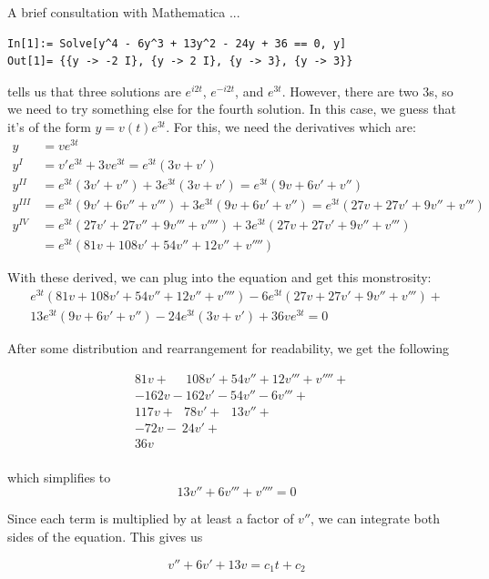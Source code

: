 \documentclass[11pt,answers]{exam}
\begin{document}
\begin{questions}
\begin{solution}
A brief consultation with Mathematica ...
\begin{verbatim}
In[1]:= Solve[y^4 - 6y^3 + 13y^2 - 24y + 36 == 0, y]
Out[1]= {{y -> -2 I}, {y -> 2 I}, {y -> 3}, {y -> 3}}
\end{verbatim}
tells us that three solutions are $e^{i2t}$, $e^{-i2t}$, and $e^{3t}$.  However, there are two $3$s, so we need to try something else for the fourth solution.  In this case, we guess that it's of the form $y = v(t)e^{3t}$.  For this, we need the derivatives which are:
\begin{align*}
y &= ve^{3t} \\
y^I &= v'e^{3t} + 3ve^{3t} = e^{3t}(3v + v') \\
y^{II} &= e^{3t}(3v' + v'') + 3e^{3t}(3v + v') = e^{3t}(9v + 6v' + v'') \\
y^{III} &= e^{3t}(9v' + 6v'' + v''') + 3e^{3t}(9v + 6v' + v'') = e^{3t}(27v + 27v' + 9v'' + v''') \\
y^{IV} &= e^{3t}(27v' + 27v'' + 9v''' + v'''') + 3e^{3t}(27v + 27v' + 9v'' + v''')\\
&= e^{3t}(81v + 108v' + 54v'' + 12v'' + v'''')
\end{align*}

With these derived, we can plug into the equation and get this monstrosity:
\begin{multline*}
e^{3t}(81v + 108v' + 54v'' + 12v'' + v'''') - 6e^{3t}(27v + 27v' + 9v'' + v''') + \\
13e^{3t}(9v + 6v' + v'') - 24e^{3t}(3v + v') + 36ve^{3t} = 0
\end{multline*}

After some distribution and rearrangement for readability, we get the following

\begin{align*}
&81v + \:\:\:\:\:\: 108v' + 54v'' + 12v''' + v''''  +  \\
&-162v - 162v' - 54v'' - 6v'''  +  \\
&117v + \:\:\: 78v' + \:\:\: 13v'' + \\
&-72v - \: 24v' + \\
&36v \\
\end{align*}

which simplifies to
\[
13v'' + 6v''' + v'''' = 0
\]


Since each term is multiplied by at least a factor of $v''$, we can integrate both sides of the equation. This gives us

\begin{equation}
v'' + 6v' + 13v = c_{1}t + c_{2}
\end{equation}


\end{solution}
\end{questions}
\end{document}
